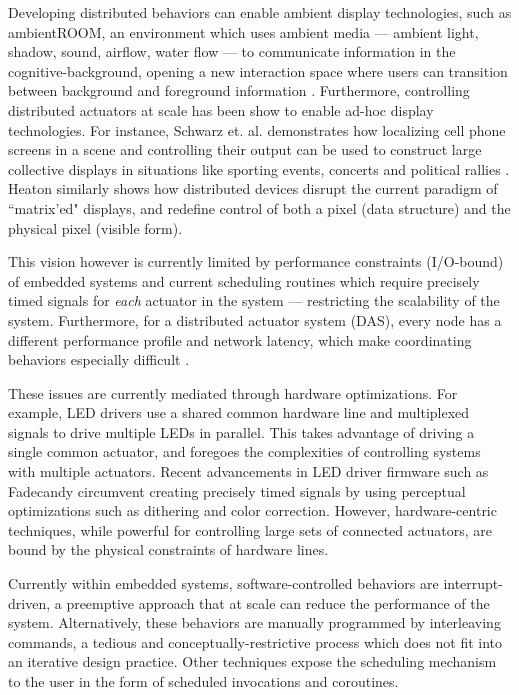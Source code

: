\documentclass{sigchi}
\begin{document}
Developing distributed behaviors can enable ambient display technologies, such as ambientROOM, an environment which uses ambient media –-- ambient light, shadow, sound, airflow, water flow --- to communicate information in the cognitive-background, opening a new interaction space where users can transition between background and foreground information \cite{ishii_tangible_1997}. Furthermore, controlling distributed actuators at scale has been show to enable ad-hoc display technologies. For instance, Schwarz et. al. demonstrates how localizing cell phone screens in a scene and controlling their output can be used to construct large collective displays in situations like sporting events, concerts and political rallies \cite{schwarz_phone_2012}. Heaton similarly shows how distributed devices disrupt the current paradigm of ``matrix'ed" displays, and redefine control of both a pixel (data structure) and the physical pixel (visible form)\cite{heaton_physical_2000}.

This vision however is currently limited by performance constraints (I/O-bound) of embedded systems and current scheduling routines which require precisely timed signals for \textit{each} actuator in the system --- restricting the scalability of the system. Furthermore, for a distributed actuator system (DAS), every node has a different performance profile and network latency, which make coordinating behaviors especially difficult \cite{ballagas_patch_2004}. 


These issues are currently mediated through hardware optimizations. For example, LED drivers use a shared common hardware line and multiplexed signals to drive multiple LEDs in parallel. This takes advantage of driving a single common actuator, and foregoes the complexities of controlling systems with multiple actuators. Recent advancements in LED driver firmware such as Fadecandy \cite{scott_fadecandy_2013} circumvent creating precisely timed signals by using perceptual optimizations such as dithering and color correction. However, hardware-centric techniques, while powerful for controlling large sets of connected actuators, are bound by the physical constraints of hardware lines. 

Currently within embedded systems, software-controlled behaviors are interrupt-driven, a preemptive approach that at scale can reduce the performance of the system. Alternatively, these behaviors are manually programmed by interleaving commands, a tedious and conceptually-restrictive process which does not fit into an iterative design practice. Other techniques expose the scheduling mechanism to the user in the form of scheduled invocations and coroutines. 
 
\end{document}

